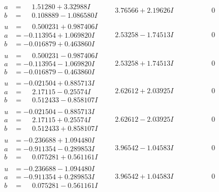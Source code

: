 \documentclass[1p]{elsarticle_modified}
\theoremstyle{definition}
\begin{document}
$$\begin{array}{c|c|c}
\begin{aligned}
a &= \phantom{-}1.51280 + 3.32988 I \\
b &= \phantom{-}0.108889 - 1.086580 I\end{aligned}
 & \phantom{-}3.76566 + 2.19626 I & \phantom{-0.000000 } 0 \\ \hline\begin{aligned}
u &= \phantom{-}0.500231 + 0.987406 I \\
a &= -0.113954 + 1.069820 I \\
b &= -0.016879 + 0.463860 I\end{aligned}
 & \phantom{-}2.53258 - 1.74513 I & \phantom{-0.000000 } 0 \\ \hline\begin{aligned}
u &= \phantom{-}0.500231 - 0.987406 I \\
a &= -0.113954 - 1.069820 I \\
b &= -0.016879 - 0.463860 I\end{aligned}
 & \phantom{-}2.53258 + 1.74513 I & \phantom{-0.000000 } 0 \\ \hline\begin{aligned}
u &= -0.021504 + 0.885713 I \\
a &= \phantom{-}2.17115 - 0.25574 I \\
b &= \phantom{-}0.512433 - 0.858107 I\end{aligned}
 & \phantom{-}2.62612 + 2.03925 I & \phantom{-0.000000 } 0 \\ \hline\begin{aligned}
u &= -0.021504 - 0.885713 I \\
a &= \phantom{-}2.17115 + 0.25574 I \\
b &= \phantom{-}0.512433 + 0.858107 I\end{aligned}
 & \phantom{-}2.62612 - 2.03925 I & \phantom{-0.000000 } 0 \\ \hline\begin{aligned}
u &= -0.236688 + 1.094480 I \\
a &= -0.911354 - 0.289853 I \\
b &= \phantom{-}0.075281 + 0.561161 I\end{aligned}
 & \phantom{-}3.96542 - 1.04583 I & \phantom{-0.000000 } 0 \\ \hline\begin{aligned}
u &= -0.236688 - 1.094480 I \\
a &= -0.911354 + 0.289853 I \\
b &= \phantom{-}0.075281 - 0.561161 I\end{aligned}
 & \phantom{-}3.96542 + 1.04583 I & \phantom{-0.000000 } 0\\

\end{array}$$
\end{document}

